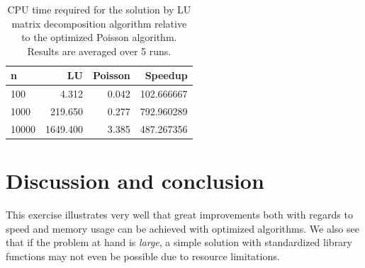 \documentclass[]{article}
\begin{document}
\begin{table}[ht]
\caption{CPU time required for the solution by LU matrix decomposition algorithm relative to the optimized Poisson algorithm. Results are averaged over 5 runs.}
\label{tab:lu}
\begin{center}
\begin{tabular}{lrrr}
	\toprule
	n &        LU &  Poisson &     Speedup \\
	\midrule
	100     &     4.312 &    0.042 &  102.666667 \\
	1000    &   219.650 &    0.277 &  792.960289 \\
	10000   &  1649.400 &    3.385 &  487.267356 \\
	\bottomrule
\end{tabular}
\end{center}
\end{table}

\section*{Discussion and conclusion}
This exercise illustrates very well that great improvements both with regards to speed and memory usage can be achieved with optimized algorithms. We also see that if the problem at hand is \textit{large}, a simple solution with standardized library functions may not even be possible due to resource limitations.
\end{document}
